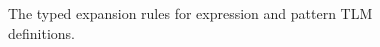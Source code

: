 \documentclass[acmsmall]{acmart}
\begin{document}
\begin{figure}
{\small\begin{mathpar}
\end{mathpar}}
{\small\begin{mathpar}
\end{mathpar}}
\caption{The typed expansion rules for expression and pattern TLM definitions.}
\label{fig:ee-def-setlm}
\vspace{-5px}
\end{figure}





\end{document}
